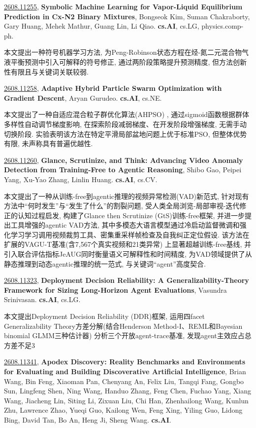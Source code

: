 \documentclass[9pt, a4paper]{article}
\theoremstyle{plain}
\theoremstyle{definition}
\theoremstyle{remark}
\newcommand{\arxivwithtarget}[3]{\hypertarget{#1}{}\href{https://arxiv.org/abs/#1}{#1}, \textbf{\textcolor{arxivblue}{#2}}, #3. }
\begin{document}
\arxivwithtarget{2608.11255}{Symbolic Machine Learning for Vapor-Liquid Equilibrium Prediction in Cx-N2 Binary Mixtures}{Bongseok Kim, Suman Chakraborty, Gary Huang, Mehek Mathur, Guang Lin, Li Qiao}\textbf{cs.AI}, cs.LG, physics.comp-ph.

本文提出一种符号机器学习方法, 为Peng-Robinson状态方程在烃-氮二元混合物气液平衡预测中引入可解释的符号修正, 通过两阶段策略提升预测精度, 但方法创新性有限且与关键词关联较弱.


\arxivwithtarget{2608.11258}{Adaptive Hybrid Particle Swarm Optimization with Gradient Descent}{Aryan Gurudeo}\textbf{cs.AI}, cs.NE.

本文提出了一种自适应混合粒子群优化算法(AHPSO) , 通过sigmoid函数根据群体多样性自动调节梯度影响, 在探索阶段减弱梯度、在开发阶段增强梯度, 无需手动切换阶段. 实验表明该方法在特定平滑局部盆地问题上优于标准PSO, 但整体优势有限, 未声称具有普遍优越性.


\arxivwithtarget{2608.11260}{Glance, Scrutinize, and Think: Advancing Video Anomaly Detection from Training-Free to Agentic Reasoning}{Shibo Gao, Peipei Yang, Xu-Yao Zhang, Linlin Huang}\textbf{cs.AI}, cs.CV.

本文提出了一种从训练-free到agentic推理的视频异常检测(VAD)新范式, 针对现有方法中“何时发生”与“发生了什么”的割裂问题, 受人类全局浏览-局部审视-迭代修正的认知过程启发, 构建了Glance then Scrutinize (GtS)训练-free框架, 并进一步提出工具增强的agentic VAD方法, 其中多模态大语言模型通过冷启动监督微调和强化学习学习调用视频裁剪工具、密集重采样帧检查及自我纠正定位假设. 该方法在扩展的VAGU-T基准(含7,567个真实视频和21类异常) 上显著超越训练-free基线, 并引入联合评估指标JeAUG同时衡量语义可解释性和时间精度, 为VAD领域提供了从静态推理到动态agentic推理的统一范式, 与关键词“agent”高度契合.


\arxivwithtarget{2608.11323}{Deployment Decision Reliability: A Generalizability-Theory Framework for Sizing Long-Horizon Agent Evaluations}{Vasundra Srinivasan}\textbf{cs.AI}, cs.LG.

本文提出Deployment Decision Reliability (DDR)框架, 运用四facet Generalizability Theory方差分解(结合Henderson Method-I、REML和Bayesian binomial GLMM三种估计器) 分析三个开放agent-trace基准, 发现agent主效应占总方差不足3%


\arxivwithtarget{2608.11341}{Apodex Discovery: Reality Benchmarks and Environments for Evaluating and Building Discoverative Artificial Intelligence}{Brian Wang, Bin Feng, Xiaoman Pan, Chenyang An, Felix Liu, Tangqi Fang, Gongbo Sun, Lingfeng Shen, Ning Wang, Handuo Zhang, Feng Chen, Fuchao Yang, Xiang Wang, Jiacheng Lin, Siting Li, Zixuan Liu, Chi Han, Zhenhailong Wang, Kunlun Zhu, Lawrence Zhao, Yueqi Guo, Kailong Wen, Feng Xing, Yiling Guo, Lidong Bing, David Tan, Bo An, Heng Ji, Sheng Wang}\textbf{cs.AI}.
\end{document}
